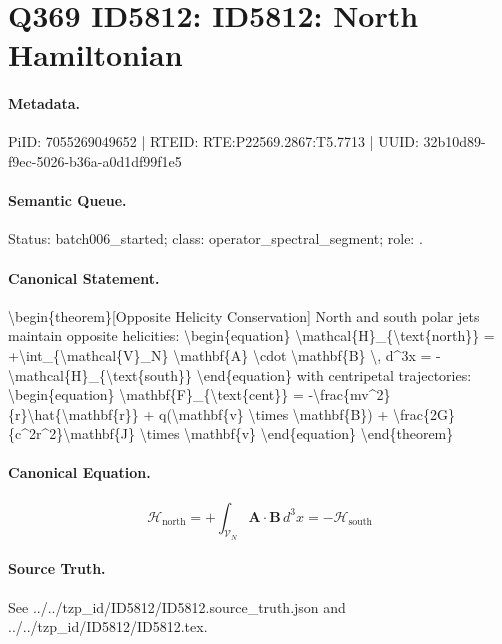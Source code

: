 \section*{Q369 ID5812: ID5812: North Hamiltonian}
\paragraph{Metadata.}
PiID: 7055269049652 | RTEID: RTE:P22569.2867:T5.7713 | UUID: 32b10d89-f9ec-5026-b36a-a0d1df99f1e5

\paragraph{Semantic Queue.}
Status: batch006\_started; class: operator\_spectral\_segment; role: .

\paragraph{Canonical Statement.}
\textbackslash{}begin\{theorem\}[Opposite Helicity Conservation] North and south polar jets maintain opposite helicities: \textbackslash{}begin\{equation\} \textbackslash{}mathcal\{H\}\_\{\textbackslash{}text\{north\}\} = +\textbackslash{}int\_\{\textbackslash{}mathcal\{V\}\_N\} \textbackslash{}mathbf\{A\} \textbackslash{}cdot \textbackslash{}mathbf\{B\} \textbackslash{}, d\textasciicircum{}3x = -\textbackslash{}mathcal\{H\}\_\{\textbackslash{}text\{south\}\} \textbackslash{}end\{equation\} with centripetal trajectories: \textbackslash{}begin\{equation\} \textbackslash{}mathbf\{F\}\_\{\textbackslash{}text\{cent\}\} = -\textbackslash{}frac\{mv\textasciicircum{}2\}\{r\}\textbackslash{}hat\{\textbackslash{}mathbf\{r\}\} + q(\textbackslash{}mathbf\{v\} \textbackslash{}times \textbackslash{}mathbf\{B\}) + \textbackslash{}frac\{2G\}\{c\textasciicircum{}2r\textasciicircum{}2\}\textbackslash{}mathbf\{J\} \textbackslash{}times \textbackslash{}mathbf\{v\} \textbackslash{}end\{equation\} \textbackslash{}end\{theorem\}

\paragraph{Canonical Equation.}
\[
\begin{equation} \mathcal{H}_{\text{north}} = +\int_{\mathcal{V}_N} \mathbf{A} \cdot \mathbf{B} \, d^3x = -\mathcal{H}_{\text{south}} \end{equation}
\]

\paragraph{Source Truth.}
See ../../tzp\_id/ID5812/ID5812.source\_truth.json and ../../tzp\_id/ID5812/ID5812.tex.
